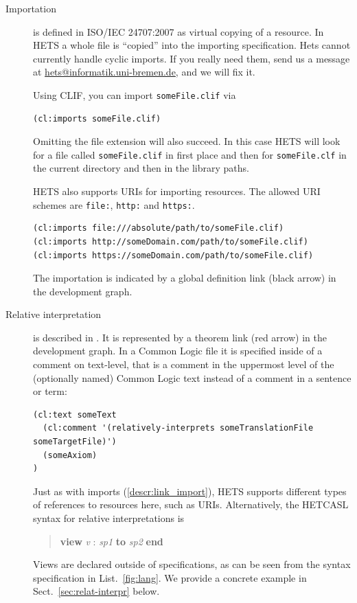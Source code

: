 \documentclass{article}
\newcommand{\normalTEXTSC}[2]{{#1\scriptsize#2}}
\newcommand     {\Hets}{\normalTEXTSC{H}{ETS}\xspace}
\newcommand{\HetCASL}{\normalTEXTSC{H}{ET}\normalTEXTSC{C}{ASL}\xspace}
\begin{document}
\begin{description}
\item[Importation] \label{descr:link_import}
  is defined in ISO/IEC 24707:2007 \cite{CommonLogic:oldfashioned} as virtual copying of a 
  resource. In \Hets a whole file is ``copied'' into the importing  
  specification. Hets cannot currently handle cyclic imports. If you really need
  them, send us a message at \href{mailto:hets@informatik.uni-bremen.de}{hets@informatik.uni-bremen.de}, and we will fix it.
  
  Using CLIF, you can import \texttt{someFile.clif} via
  \begin{lstlisting}[language=clif]
(cl:imports someFile.clif)
  \end{lstlisting}
  Omitting the file extension will also succeed. In this case \Hets will look 
  for a file called \texttt{someFile.clif} in first place and then for 
  \texttt{someFile.clf} in the current directory and then in the library paths.

  \Hets also supports URIs for importing resources. The allowed URI schemes are
  \texttt{file:}, \texttt{http:} and \texttt{https:}.
  \begin{lstlisting}[language=clif]
(cl:imports file:///absolute/path/to/someFile.clif)
(cl:imports http://someDomain.com/path/to/someFile.clif)
(cl:imports https://someDomain.com/path/to/someFile.clif)
  \end{lstlisting}

  The importation is indicated by a global definition link (black arrow) in the 
  development graph.

\item[Relative interpretation]
  is described in \cite{colore-fois}. It is represented by a theorem link 
  (red arrow) in the development graph. In a Common Logic file it is specified 
  inside of a comment on text-level, that is a comment in the uppermost level 
  of the (optionally named) Common Logic text instead of a comment in a sentence or 
  term:
  
  \begin{lstlisting}[language=clif]
(cl:text someText
  (cl:comment '(relatively-interprets someTranslationFile someTargetFile)')
  (someAxiom)
)
  \end{lstlisting}
  Just as with imports (\ref{descr:link_import}), \Hets supports different types 
  of references to resources here, such as URIs.
  Alternatively, the \HetCASL syntax for relative interpretations is
\begin{quote}
\textbf{view} \textit{v} : \textit{sp1} \textbf{to} \textit{sp2} \textbf{end}
\end{quote}
  Views are declared outside of specifications, as can be seen from the syntax specification in List.~\ref{fig:lang}.  We provide a concrete example in Sect.~\ref{sec:relat-interpr} below.
  

\end{description}
\end{document}
